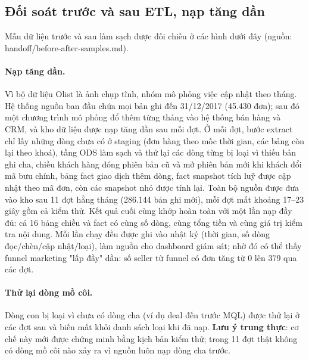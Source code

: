 \subsection{Đối soát trước và sau ETL, nạp tăng dần}
Mẫu dữ liệu trước và sau làm sạch được đối chiếu ở các hình dưới đây (nguồn: handoff/before-after-samples.md).
\paragraph{Nạp tăng dần.}
Vì bộ dữ liệu Olist là ảnh chụp tĩnh, nhóm mô phỏng việc cập nhật theo tháng. Hệ thống nguồn ban đầu chứa mọi bản ghi đến 31/12/2017 (45.430 đơn); sau đó một chương trình mô phỏng đổ thêm từng tháng vào hệ thống bán hàng và CRM, và kho dữ liệu được nạp tăng dần sau mỗi đợt. Ở mỗi đợt, bước extract chỉ lấy những dòng chưa có ở staging (đơn hàng theo mốc thời gian, các bảng còn lại theo khoá), tầng ODS làm sạch và thử lại các dòng từng bị loại vì thiếu bản ghi cha, chiều khách hàng đóng phiên bản cũ và mở phiên bản mới khi khách đổi mã bưu chính, bảng fact giao dịch thêm dòng, fact snapshot tích luỹ được cập nhật theo mã đơn, còn các snapshot nhỏ được tính lại. Toàn bộ nguồn được đưa vào kho sau 11 đợt hằng tháng (286.144 bản ghi mới), mỗi đợt mất khoảng 17–23 giây gồm cả kiểm thử. Kết quả cuối cùng khớp hoàn toàn với một lần nạp đầy đủ: cả 16 bảng chiều và fact có cùng số dòng, cùng tổng tiền và cùng giá trị kiểm tra nội dung. Mỗi lần chạy đều được ghi vào nhật ký  (thời gian, số dòng đọc/chèn/cập nhật/loại), làm nguồn cho dashboard giám sát; nhờ đó có thể thấy funnel marketing "lấp đầy" dần: số seller từ funnel có đơn tăng từ 0 lên 379 qua các đợt.


\paragraph{Thử lại dòng mồ côi.} Dòng con bị loại vì chưa có dòng cha (ví dụ deal đến trước MQL) được thử lại ở các đợt sau và biến mất khỏi danh sách loại khi đã nạp. \textbf{Lưu ý trung thực}: cơ chế này mới được chứng minh bằng kịch bản kiểm thử; trong 11 đợt thật không có dòng mồ côi nào xảy ra vì nguồn luôn nạp dòng cha trước.
